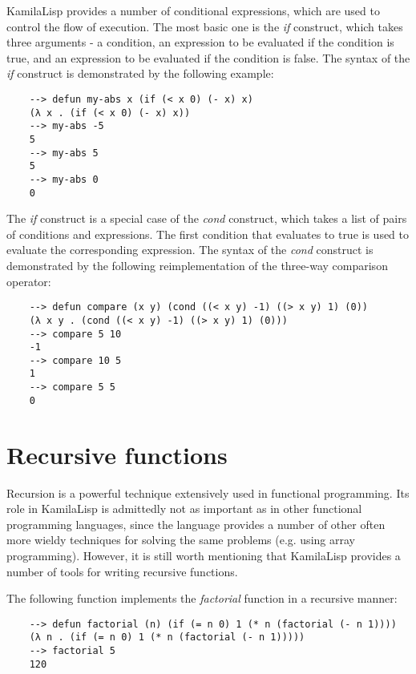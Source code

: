 KamilaLisp provides a number of conditional expressions, which are used to control the flow of execution. The most basic one is the \textit{if} construct, which takes three arguments - a condition, an expression to be evaluated if the condition is true, and an expression to be evaluated if the condition is false. The syntax of the \textit{if} construct is demonstrated by the following example:

\begin{Verbatim}
    --> defun my-abs x (if (< x 0) (- x) x)
    (λ x . (if (< x 0) (- x) x))
    --> my-abs -5
    5
    --> my-abs 5
    5
    --> my-abs 0
    0
\end{Verbatim}

The \textit{if} construct is a special case of the \textit{cond} construct, which takes a list of pairs of conditions and expressions. The first condition that evaluates to true is used to evaluate the corresponding expression. The syntax of the \textit{cond} construct is demonstrated by the following reimplementation of the three-way comparison operator:

\begin{Verbatim}
    --> defun compare (x y) (cond ((< x y) -1) ((> x y) 1) (0))
    (λ x y . (cond ((< x y) -1) ((> x y) 1) (0)))
    --> compare 5 10
    -1
    --> compare 10 5
    1
    --> compare 5 5
    0
\end{Verbatim}

\section{Recursive functions}

Recursion is a powerful technique extensively used in functional programming. Its role in KamilaLisp is admittedly not as important as in other functional programming languages, since the language provides a number of other often more wieldy techniques for solving the same problems (e.g. using array programming). However, it is still worth mentioning that KamilaLisp provides a number of tools for writing recursive functions.

The following function implements the \textit{factorial} function in a recursive manner:

\begin{Verbatim}
    --> defun factorial (n) (if (= n 0) 1 (* n (factorial (- n 1))))
    (λ n . (if (= n 0) 1 (* n (factorial (- n 1)))))
    --> factorial 5
    120
\end{Verbatim}

